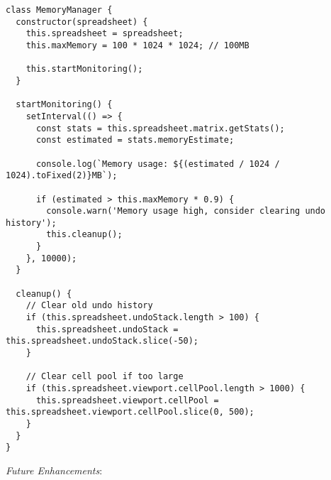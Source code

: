 \documentclass[11pt]{article}
\begin{document}
\begin{verbatim}
class MemoryManager {
  constructor(spreadsheet) {
    this.spreadsheet = spreadsheet;
    this.maxMemory = 100 * 1024 * 1024; // 100MB
    
    this.startMonitoring();
  }
  
  startMonitoring() {
    setInterval(() => {
      const stats = this.spreadsheet.matrix.getStats();
      const estimated = stats.memoryEstimate;
      
      console.log(`Memory usage: ${(estimated / 1024 / 1024).toFixed(2)}MB`);
      
      if (estimated > this.maxMemory * 0.9) {
        console.warn('Memory usage high, consider clearing undo history');
        this.cleanup();
      }
    }, 10000);
  }
  
  cleanup() {
    // Clear old undo history
    if (this.spreadsheet.undoStack.length > 100) {
      this.spreadsheet.undoStack = this.spreadsheet.undoStack.slice(-50);
    }
    
    // Clear cell pool if too large
    if (this.spreadsheet.viewport.cellPool.length > 1000) {
      this.spreadsheet.viewport.cellPool = this.spreadsheet.viewport.cellPool.slice(0, 500);
    }
  }
}
\end{verbatim}

\emph{Future Enhancements}:
\end{document}
